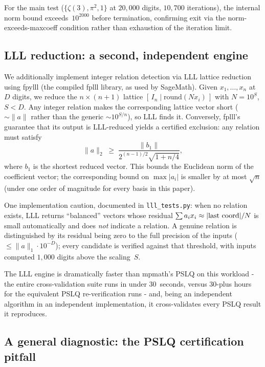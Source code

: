 \documentclass[12pt]{article}
\theoremstyle{definition}
\theoremstyle{remark}
\begin{document}
For the main test ($\{\zeta(3),\pi^2,1\}$ at $20{,}000$ digits,
$10{,}700$ iterations), the internal norm bound exceeds~$10^{2000}$
before termination, confirming exit via the norm-exceeds-maxcoeff
condition rather than exhaustion of the iteration limit.

\subsection{LLL reduction: a second, independent engine}\label{sec:lll}

We additionally implement integer relation detection via LLL lattice
reduction using fpylll (the compiled fplll library, as used by
SageMath).  Given $x_1,\ldots,x_n$ at $D$ digits, we reduce the
$n\times(n{+}1)$ lattice $[\,I_n \mid \mathrm{round}(N x_i)\,]$ with
$N = 10^S$, $S < D$.  Any integer relation makes the corresponding
lattice vector short ($\sim\|a\|$ rather than the generic
$\sim 10^{S/n}$), so LLL finds it.  Conversely, fplll's guarantee that
its output is LLL-reduced yields a certified exclusion: any relation
must satisfy
\[
  \|a\|_2 \;\ge\; \frac{\|b_1\|}{2^{(n-1)/2}\sqrt{1+n/4}},
\]
where $b_1$ is the shortest reduced vector.  This bounds the Euclidean
norm of the coefficient vector; the corresponding bound on
$\max|a_i|$ is smaller by at most $\sqrt{n}$ (under one order of
magnitude for every basis in this paper).

One implementation caution, documented in \texttt{lll\_tests.py}:
when no relation exists, LLL returns ``balanced'' vectors whose
residual $\sum a_i x_i \approx |{\rm last\ coord}|/N$ is small
automatically and does \emph{not} indicate a relation.  A genuine
relation is distinguished by its residual being zero to the full
precision of the inputs ($\le \|a\|_1\cdot 10^{-D}$); every candidate
is verified against that threshold, with inputs computed $1{,}000$
digits above the scaling~$S$.

The LLL engine is dramatically faster than mpmath's PSLQ on this
workload - the entire cross-validation suite runs in under 30~seconds,
versus 30-plus hours for the equivalent PSLQ re-verification runs -
and, being an independent algorithm in an independent implementation,
it cross-validates every PSLQ result it reproduces.

\subsection{A general diagnostic: the PSLQ certification
pitfall}\label{sec:pitfall}
\end{document}
